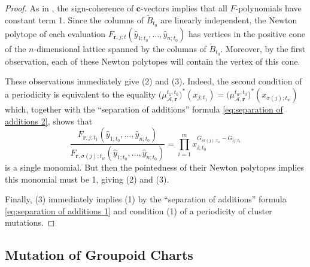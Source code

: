 \documentclass{amsart}
\numberwithin{equation}{section}
\newcommand{\bfc}{\mathbf{c}}
\newcommand{\bfr}{{\boldsymbol{r}}}
\newcommand{\cA}{\mathcal{A}}
\begin{document}
\begin{proof}
  As in \cite[Proposition 5.6]{FZ07}, the sign-coherence of $\bfc$-vectors implies that all $F$-polynomials have constant term 1.
  Since the columns of $\tilde B_{t_0}$ are linearly independent, the Newton polytope of each evaluation $F_{\bfr,j;t}(\hat y_{1;t_0},\ldots,\hat y_{n;t_0})$ has vertices in the positive cone of the $n$-dimensional lattice spanned by the columns of $\tilde B_{t_0}$.
  Moreover, by the first observation, each of these Newton polytopes will contain the vertex of this cone.
  
  These observations immediately give (2) and (3).
  Indeed, the second condition of a periodicity is equivalent to the equality $\big(\mu_{\cA,\bfr}^{t_1,t_0}\big)^*(x_{j;t_1})=\big(\mu_{\cA,\bfr}^{t_w,t_0}\big)^*(x_{\sigma(j);t_w})$ which, together with the ``separation of additions'' formula \eqref{eq:separation of additions 2}, shows that 
  \[\frac{F_{\bfr,j;t_1}(\hat y_{1;t_0},\ldots,\hat y_{n;t_0})}{F_{\bfr,\sigma(j);t_w}(\hat y_{1;t_0},\ldots,\hat y_{n;t_0})}=\prod_{i=1}^m x_{i;t_0}^{G_{i\sigma(j);t_w}-G_{ij;t_1}}\]
  is a single monomial.
  But then the pointedness of their Newton polytopes implies this monomial must be 1, giving (2) and (3).

  Finally, (3) immediately implies (1) by the ``separation of additions'' formula \eqref{eq:separation of additions 1} and condition (1) of a periodicity of cluster mutations.
\end{proof}


\subsection{Mutation of Groupoid Charts}
\label{sec:groupoid mutations}
\end{document}
